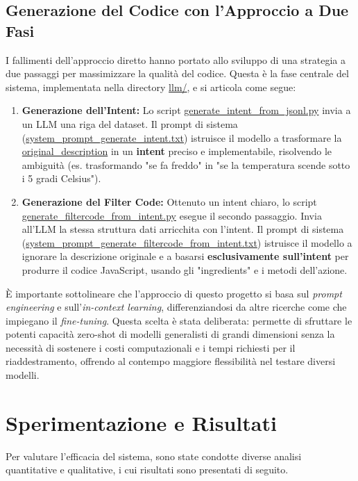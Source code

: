 \documentclass[sigconf,natbib=false]{acmart}
\begin{document}
\subsection{Generazione del Codice con l'Approccio a Due Fasi}
I fallimenti dell'approccio diretto hanno portato allo sviluppo di una strategia a due passaggi per massimizzare la qualità del codice. Questa è la fase centrale del sistema, implementata nella directory \url{llm/}, e si articola come segue:

\begin{enumerate}
    \item \textbf{Generazione dell'Intent:} Lo script \url{generate_intent_from_jsonl.py} invia a un LLM una riga del dataset. Il prompt di sistema (\url{system_prompt_generate_intent.txt}) istruisce il modello a trasformare la \url{original_description} in un \textbf{intent} preciso e implementabile, risolvendo le ambiguità (es. trasformando "se fa freddo" in "se la temperatura scende sotto i 5 gradi Celsius").
    
    \item \textbf{Generazione del Filter Code:} Ottenuto un intent chiaro, lo script \url{generate_filtercode_from_intent.py} esegue il secondo passaggio. Invia all'LLM la stessa struttura dati arricchita con l'intent. Il prompt di sistema (\url{system_prompt_generate_filtercode_from_intent.txt}) istruisce il modello a ignorare la descrizione originale e a basarsi \textbf{esclusivamente sull'intent} per produrre il codice JavaScript, usando gli "ingredients" e i metodi dell'azione.
\end{enumerate}

È importante sottolineare che l'approccio di questo progetto si basa sul \textit{prompt engineering} e sull'\textit{in-context learning}, differenziandosi da altre ricerche come \cite{cimino2025sigfrid} che impiegano il \textit{fine-tuning}. Questa scelta è stata deliberata: permette di sfruttare le potenti capacità zero-shot di modelli generalisti di grandi dimensioni senza la necessità di sostenere i costi computazionali e i tempi richiesti per il riaddestramento, offrendo al contempo maggiore flessibilità nel testare diversi modelli.

\section{Sperimentazione e Risultati}
Per valutare l'efficacia del sistema, sono state condotte diverse analisi quantitative e qualitative, i cui risultati sono presentati di seguito.
\end{document}
